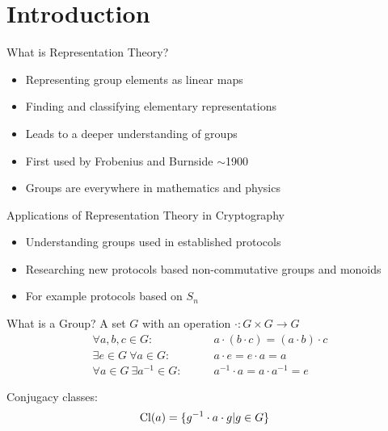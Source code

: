 
\section{Introduction}

\begin{frame}{What is Representation Theory?}
    \large
    \begin{itemize}
        \item Representing group elements as linear maps \pause
        \item Finding and classifying elementary representations \pause
        \item Leads to a deeper understanding of groups \pause
        \item First used by Frobenius and Burnside $\sim$1900 \pause
        \item Groups are everywhere in mathematics and physics
    \end{itemize}
\end{frame}

\begin{frame}{Applications of Representation Theory in Cryptography}
    \large
    \begin{itemize}
        \item Understanding groups used in established protocols \pause
        \item Researching new protocols based non-commutative groups and monoids \pause
        \item For example protocols based on $S_n$
    \end{itemize}
    
    \normalsize
    \hspace*{\fill} \cite{khovanov2022monoidal,doliskani2008cryptosystem}
\end{frame}

\begin{frame}{What is a Group?}
    \Large
    A set $G$ with an operation $\cdot: G \times G \to G$ \pause
    \large
    \begin{align*}
        \forall a, b, c \in G: \qquad & a \cdot (b \cdot c) = (a \cdot b) \cdot c \\
        \exists e \in G\ \forall a \in G: \qquad & a \cdot e = e \cdot a = a \\
        \forall a \in G\ \exists a^{-1} \in G: \qquad & a^{-1} \cdot a = a \cdot a^{-1} = e
    \end{align*}

    \pause
    \vspace{1em}
    Conjugacy classes:
    \begin{align*}
        \operatorname{Cl}(a) & = \{g^{-1} \cdot a \cdot g | g \in G \}
    \end{align*}
    
\end{frame}

